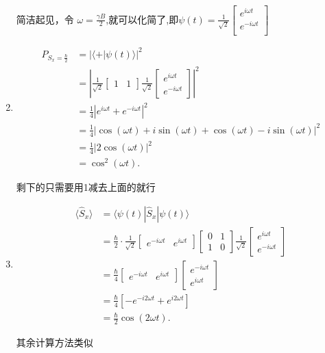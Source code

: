 \documentclass[lang=cn,15pt]{elegantbook}
\begin{document}
\begin{solution}
\begin{enumerate}
		简洁起见，令 $\omega = \frac{\gamma B}{2}$,就可以化简了,即$\psi (t)=\frac{1}{\sqrt{2}}\left[ \begin{array}{c}
			e^{i\omega t}\\
			e^{-i\omega t}\\
		\end{array} \right] $
		
		\item \begin{align*}
			P_{S_x = \frac{\hbar}{2}} &= \left| \langle + | \psi(t) \rangle \right|^2 \\
			&= \left| \frac{1}{\sqrt{2}} \begin{bmatrix} 1 & 1 \end{bmatrix} \frac{1}{\sqrt{2}} \begin{bmatrix} e^{i\omega t} \\ e^{-i\omega t} \end{bmatrix} \right|^2 \\
			&= \frac{1}{4} \left| e^{i\omega t} + e^{-i\omega t} \right|^2 \\
			&= \frac{1}{4} \left| \cos(\omega t) + i\sin(\omega t) + \cos(\omega t) - i\sin(\omega t) \right|^2 \\
			&= \frac{1}{4} \left| 2\cos(\omega t) \right|^2 \\
			&= \cos^2(\omega t).
		\end{align*} 
		
		剩下的只需要用1减去上面的就行
		
		\item \begin{align*}
			\langle \hat{S}_x \rangle &= \langle \psi(t) | \hat{S}_x | \psi(t) \rangle \\
			&= \frac{\hbar}{2} \cdot \frac{1}{\sqrt{2}} \begin{bmatrix} e^{-i\omega t} & e^{i\omega t} \end{bmatrix} \begin{bmatrix} 0 & 1 \\ 1 & 0 \end{bmatrix} \frac{1}{\sqrt{2}} \begin{bmatrix} e^{i\omega t} \\ e^{-i\omega t} \end{bmatrix} \\
			&= \frac{\hbar}{4} \begin{bmatrix} e^{-i\omega t} & e^{i\omega t} \end{bmatrix} \begin{bmatrix} e^{-i\omega t} \\ e^{i\omega t} \end{bmatrix} \\
			&= \frac{\hbar}{4} \left[ -e^{-i2\omega t} + e^{i2\omega t} \right] \\
			&= \frac{\hbar}{2} \cos(2\omega t).
		\end{align*}
		
		其余计算方法类似
	\end{enumerate}
\end{solution}
\end{document}

